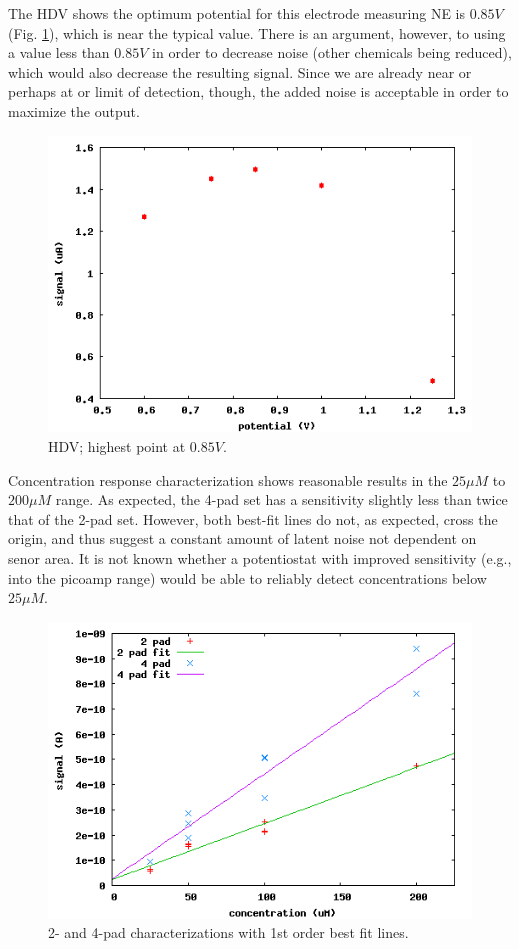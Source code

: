\documentclass[twocolumn]{article}
\begin{document}
The HDV shows the optimum potential for this electrode measuring NE is $0.85V$ (Fig. \ref{hdv}), which is near the typical value. There is an argument, however, to using a value less than $0.85V$ in order to decrease noise (other chemicals being reduced), which would also decrease the resulting signal. Since we are already near or perhaps at or limit of detection, though, the added noise is acceptable in order to maximize the output.

\begin{figure}
\centering
\includegraphics[width=\linewidth]{figures/hdv.png}
\caption{HDV; highest point at $0.85V$.}
\label{hdv}
\end{figure}

Concentration response characterization shows reasonable results in the $25\mu M$ to $200\mu M$ range. As expected, the 4-pad set has a sensitivity slightly less than twice that of the 2-pad set. However, both best-fit lines do not, as expected, cross the origin, and thus suggest a constant amount of latent noise not dependent on senor area. It is not known whether a potentiostat with improved sensitivity (e.g., into the picoamp range) would be able to reliably detect concentrations below $25\mu M$.

\begin{figure}
\centering
\includegraphics[width=\linewidth]{figures/char.png}
\caption{2- and 4-pad characterizations with 1st order best fit lines.}
\label{char}
\end{figure}
\end{document}
